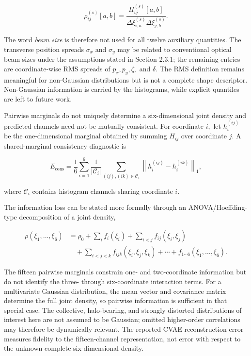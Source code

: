\begin{equation}
\label{eq:51}
\rho_{ij}^{(s)}[a,b]=\frac{H_{ij}^{(s)}[a,b]}{\Delta\xi_{i,a}^{(s)}\Delta\xi_{j,b}^{(s)}}.
\end{equation}

The word \emph{beam} \emph{size} is therefore not used for all twelve auxiliary quantities. The transverse position spreads \(\sigma_{x}\) and \(\sigma_{y}\) may be related to conventional optical beam sizes under the assumptions stated in Section 2.3.1; the remaining entries are coordinate-wise RMS spreads of \(p_{x} , p_{y} , \zeta ,\) and \(\delta .\) The RMS definition remains meaningful for non-Gaussian distributions but is not a complete shape descriptor. Non-Gaussian information is carried by the histograms, while explicit quantiles are left to future work.

Pairwise marginals do not uniquely determine a six-dimensional joint density and predicted channels need not be mutually consistent. For coordinate \(i ,\) let \(h_{i}^{( i j )}\) be the one-dimensional marginal obtained by summing \(H_{i j}\) over coordinate \(j .\) A shared-marginal consistency diagnostic is

\begin{equation}
\label{eq:52}
E_{\mathrm{cons}}=\frac16\sum_{i=1}^{6}\frac1{|\mathcal C_i|}\sum_{(ij),(ik)\in\mathcal C_i}\left\|h_i^{(ij)}-h_i^{(ik)}\right\|_1,
\end{equation}

where \(\mathcal{C}_{i}\) contains histogram channels sharing coordinate \(i .\)

The information loss can be stated more formally through an ANOVA/Hoeffding-type decomposition of a joint density,

\begin{equation}
\label{eq:53}
\begin{aligned}\rho(\xi_1,\ldots,\xi_6)&=\rho_0+\sum_i f_i(\xi_i)+\sum_{i<j}f_{ij}(\xi_i,\xi_j)\\&\quad+\sum_{i<j<k}f_{ijk}(\xi_i,\xi_j,\xi_k)+\cdots+f_{1\cdots6}(\xi_1,\ldots,\xi_6).\end{aligned}
\end{equation}

The fifteen pairwise marginals constrain one- and two-coordinate information but do not identify the three- through six-coordinate interaction terms. For a multivariate Gaussian distribution, the mean vector and covariance matrix determine the full joint density, so pairwise information is sufficient in that special case. The collective, halo-bearing, and strongly distorted distributions of interest here are not assumed to be Gaussian; omitted higher-order correlations may therefore be dynamically relevant. The reported CVAE reconstruction error measures fidelity to the fifteen-channel representation, not error with respect to the unknown complete six-dimensional density.

